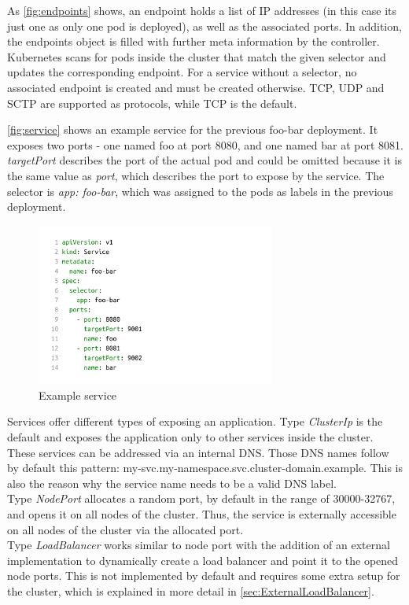 As \autoref{fig:endpoints} shows, an endpoint holds a list of IP addresses (in this case its just one as only one pod is deployed), as well as the associated ports.
In addition, the endpoints object is filled with further meta information by the controller.
Kubernetes scans for pods inside the cluster that match the given selector and updates the corresponding endpoint.
For a service without a selector, no associated endpoint is created and must be created otherwise.
TCP, UDP and SCTP are supported as protocols, while TCP is the default.

\autoref{fig:service} shows an example service for the previous foo-bar deployment.
It exposes two ports - one named foo at port 8080, and one named bar at port 8081.
\textit{targetPort} describes the port of the actual pod and could be omitted because it is the same value as \textit{port}, which describes the port to expose by the service.
The selector is \textit{app: foo-bar}, which was assigned to the pods as labels in the previous deployment.

\begin{figure}[H]
    \centering
    \includegraphics[width=0.7\textwidth, left]{media/02/service}
    \caption{Example service}
    \label{fig:service}
\end{figure}

Services offer different types of exposing an application.
Type \textit{ClusterIp} is the default and exposes the application only to other services inside the cluster.
These services can be addressed via an internal DNS.
Those DNS names follow by default this pattern: my-svc.my-namespace.svc.cluster-domain.example.
This is also the reason why the service name needs to be a valid DNS label.
\\
Type \textit{NodePort} allocates a random port, by default in the range of 30000-32767, and opens it on all nodes of the cluster.
Thus, the service is externally accessible on all nodes of the cluster via the allocated port.
\\
Type \textit{LoadBalancer} works similar to node port with the addition of an external implementation to dynamically create a load balancer and point it to the opened node ports.
This is not implemented by default and requires some extra setup for the cluster, which is explained in more detail in \autoref{sec:ExternalLoadBalancer}.~\cite{KUBERNETES-SERVICE}


